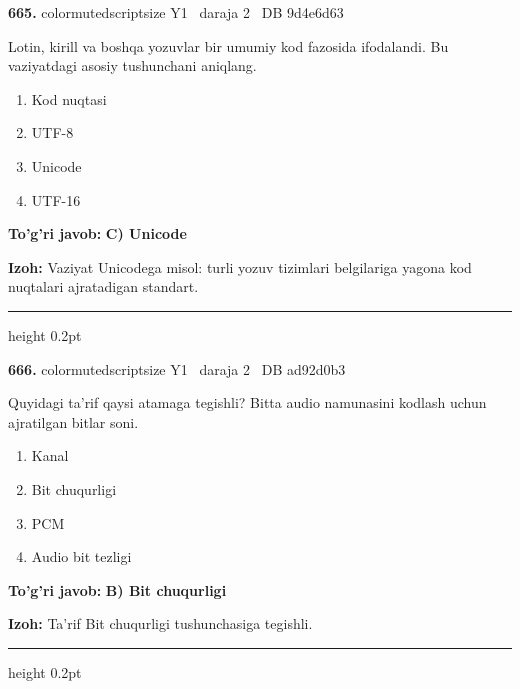 \documentclass[10pt,a4paper,oneside]{article}
\begin{document}
\noindent\textbf{\color{ink}665.}  {color{muted}scriptsize Y1 \textbullet\ daraja 2 \textbullet\ DB 9d4e6d63}
\par
Lotin, kirill va boshqa yozuvlar bir umumiy kod fazosida ifodalandi. Bu vaziyatdagi asosiy tushunchani aniqlang.
\begin{enumerate}[label=\Alph*),leftmargin=9mm]
\item Kod nuqtasi
\item UTF-8
\item Unicode
\item UTF-16
\end{enumerate}
\begin{tcolorbox}[enhanced,breakable,colback=teal!4,colframe=teal!50!black,boxrule=0.5pt,arc=1.1mm,left=3mm,right=3mm,top=1.7mm,bottom=1.7mm,before skip=2mm,after skip=2mm]
\textbf{\color{teal}To'g'ri javob:} \textbf{C) Unicode}
\par\smallskip
\textbf{Izoh:} Vaziyat Unicodega misol: turli yozuv tizimlari belgilariga yagona kod nuqtalari ajratadigan standart.
\end{tcolorbox}
\vspace{2mm}\hrule height 0.2pt \vspace{3mm}

\noindent\textbf{\color{ink}666.}  {color{muted}scriptsize Y1 \textbullet\ daraja 2 \textbullet\ DB ad92d0b3}
\par
Quyidagi ta'rif qaysi atamaga tegishli? Bitta audio namunasini kodlash uchun ajratilgan bitlar soni.
\begin{enumerate}[label=\Alph*),leftmargin=9mm]
\item Kanal
\item Bit chuqurligi
\item PCM
\item Audio bit tezligi
\end{enumerate}
\begin{tcolorbox}[enhanced,breakable,colback=teal!4,colframe=teal!50!black,boxrule=0.5pt,arc=1.1mm,left=3mm,right=3mm,top=1.7mm,bottom=1.7mm,before skip=2mm,after skip=2mm]
\textbf{\color{teal}To'g'ri javob:} \textbf{B) Bit chuqurligi}
\par\smallskip
\textbf{Izoh:} Ta'rif Bit chuqurligi tushunchasiga tegishli.
\end{tcolorbox}
\vspace{2mm}\hrule height 0.2pt \vspace{3mm}
\end{document}
